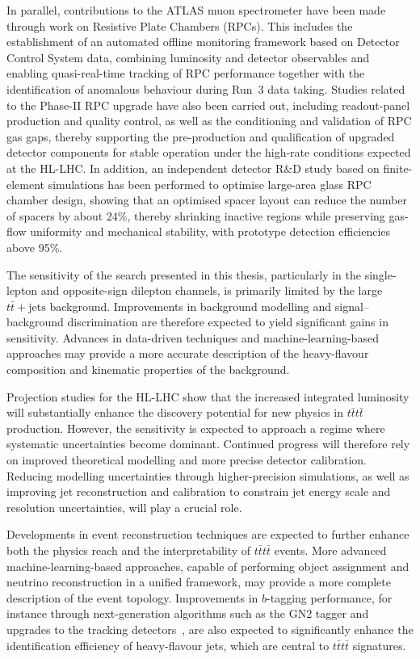 In parallel, contributions to the ATLAS muon spectrometer have been made through work on Resistive Plate Chambers (RPCs). 
This includes the establishment of an automated offline monitoring framework based on Detector Control System data, 
combining luminosity and detector observables and enabling quasi-real-time tracking of RPC performance together with the identification of anomalous behaviour during Run~3 data taking. 
Studies related to the Phase-II RPC upgrade have also been carried out, including readout-panel production and quality control, 
as well as the conditioning and validation of RPC gas gaps, thereby supporting the pre-production and qualification of upgraded detector components for stable operation under the high-rate conditions expected at the HL-LHC. 
In addition, an independent detector R\&D study based on finite-element simulations has been performed to optimise large-area glass RPC chamber design, 
showing that an optimised spacer layout can reduce the number of spacers by about 24\%, thereby shrinking inactive regions while preserving gas-flow uniformity and mechanical stability, with prototype detection efficiencies above 95\%.

The sensitivity of the search presented in this thesis, particularly in the single-lepton and opposite-sign dilepton channels, is primarily limited by the large $t\bar{t}+\mathrm{jets}$ background. 
Improvements in background modelling and signal--background discrimination are therefore expected to yield significant gains in sensitivity. 
Advances in data-driven techniques and machine-learning-based approaches may provide a more accurate description of the heavy-flavour composition and kinematic properties of the background.

Projection studies for the HL-LHC show that the increased integrated luminosity will substantially enhance the discovery potential for new physics in $t\bar{t}t\bar{t}$ production. 
However, the sensitivity is expected to approach a regime where systematic uncertainties become dominant. 
Continued progress will therefore rely on improved theoretical modelling and more precise detector calibration. 
Reducing modelling uncertainties through higher-precision simulations, as well as improving jet reconstruction and calibration to constrain jet energy scale and resolution uncertainties, will play a crucial role.

Developments in event reconstruction techniques are expected to further enhance both the physics reach and the interpretability of $t\bar{t}t\bar{t}$ events. 
More advanced machine-learning-based approaches, capable of performing object assignment and neutrino reconstruction in a unified framework, may provide a more complete description of the event topology. 
Improvements in $b$-tagging performance, for instance through next-generation algorithms such as the GN2 tagger and upgrades to the tracking detectors~\cite{ATLAS_GN2_ITk_2026}, are also expected to significantly enhance the identification efficiency of heavy-flavour jets, which are central to $t\bar{t}t\bar{t}$ signatures.

